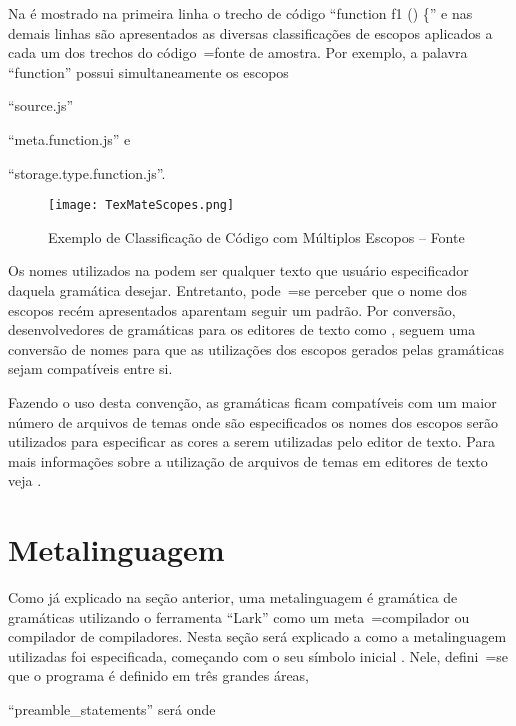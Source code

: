 Na  é mostrado na primeira linha o trecho de código ``function f1 () \{'' e
nas demais linhas são apresentados as diversas classificações de escopos aplicados a cada um dos trechos do código~=fonte de amostra.
Por exemplo, a palavra ``function'' possui simultaneamente os escopos
\begin{inparaenum}[1)]
\item ``source.js''
\item ``meta.function.js'' e
\item ``storage.type.function.js''.
\end{inparaenum}
\begin{figure}[h]
\centering
\texttt{[image: TexMateScopes.png]}
\caption[Exemplo de Classificação de Código com Múltiplos Escopos]{Exemplo de Classificação de Código com Múltiplos Escopos -- Fonte }
\label{TexMateScopes}
\end{figure}

Os nomes utilizados na  podem ser qualquer texto que usuário especificador daquela gramática desejar.
Entretanto,
pode~=se perceber que o nome dos escopos recém apresentados aparentam seguir um padrão.
Por conversão,
desenvolvedores de gramáticas para os editores de texto como ,
seguem uma conversão de nomes para que as utilizações dos escopos gerados pelas gramáticas sejam compatíveis entre si.

Fazendo o uso desta convenção,
as gramáticas ficam compatíveis com um maior número de arquivos de temas onde são especificados os nomes dos escopos serão utilizados para especificar as cores a serem utilizadas pelo editor de texto.
Para mais informações sobre a utilização de arquivos de temas em editores de texto veja .


\section{Metalinguagem}

Como já explicado na seção anterior,
uma metalinguagem é gramática de gramáticas utilizando o ferramenta ``Lark'' como um meta~=compilador ou
compilador de compiladores.
Nesta seção será explicado a como a metalinguagem utilizadas foi especificada,
começando com o seu símbolo inicial .
Nele,
defini~=se que o programa é definido em três grandes áreas,
\begin{inparaenum}[1)]
\item ``preamble\_statements'' será onde
\end{inparaenum}%

